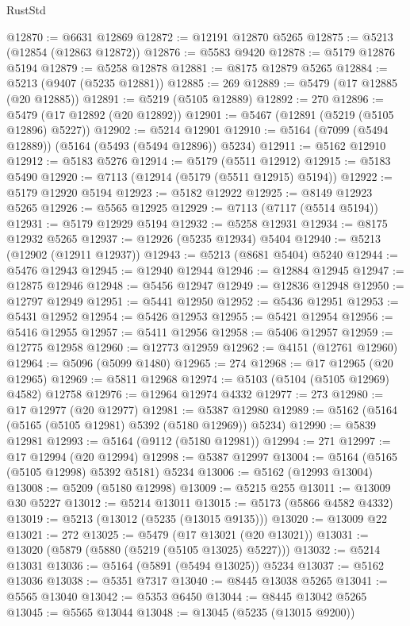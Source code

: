 \begin{lexlean}{RustStd}
\begin{coremodule}
@12870 := @6631 @12869
@12872 := @12191 @12870 @5265
@12875 := @5213 (@12854 (@12863 @12872))
@12876 := @5583 @9420
@12878 := @5179 @12876 @5194
@12879 := @5258 @12878
@12881 := @8175 @12879 @5265
@12884 := @5213 (@9407 (@5235 @12881))
@12885 := 269
@12889 := @5479 (@17 @12885 (@20 @12885))
@12891 := @5219 (@5105 @12889)
@12892 := 270
@12896 := @5479 (@17 @12892 (@20 @12892))
@12901 := @5467 (@12891 (@5219 (@5105 @12896) @5227))
@12902 := @5214 @12901
@12910 := @5164 (@7099 (@5494 @12889)) (@5164 (@5493 (@5494 @12896)) @5234)
@12911 := @5162 @12910
@12912 := @5183 @5276
@12914 := @5179 (@5511 @12912)
@12915 := @5183 @5490
@12920 := @7113 (@12914 (@5179 (@5511 @12915) @5194))
@12922 := @5179 @12920 @5194
@12923 := @5182 @12922
@12925 := @8149 @12923 @5265
@12926 := @5565 @12925
@12929 := @7113 (@7117 (@5514 @5194))
@12931 := @5179 @12929 @5194
@12932 := @5258 @12931
@12934 := @8175 @12932 @5265
@12937 := @12926 (@5235 @12934) @5404
@12940 := @5213 (@12902 (@12911 @12937))
@12943 := @5213 (@8681 @5404) @5240
@12944 := @5476 @12943
@12945 := @12940 @12944
@12946 := @12884 @12945
@12947 := @12875 @12946
@12948 := @5456 @12947
@12949 := @12836 @12948
@12950 := @12797 @12949
@12951 := @5441 @12950
@12952 := @5436 @12951
@12953 := @5431 @12952
@12954 := @5426 @12953
@12955 := @5421 @12954
@12956 := @5416 @12955
@12957 := @5411 @12956
@12958 := @5406 @12957
@12959 := @12775 @12958
@12960 := @12773 @12959
@12962 := @4151 (@12761 @12960)
@12964 := @5096 (@5099 @1480)
@12965 := 274
@12968 := @17 @12965 (@20 @12965)
@12969 := @5811 @12968
@12974 := @5103 (@5104 (@5105 @12969) @4582) @12758
@12976 := @12964 @12974 @4332
@12977 := 273
@12980 := @17 @12977 (@20 @12977)
@12981 := @5387 @12980
@12989 := @5162 (@5164 (@5165 (@5105 @12981) @5392 (@5180 @12969)) @5234)
@12990 := @5839 @12981
@12993 := @5164 (@9112 (@5180 @12981))
@12994 := 271
@12997 := @17 @12994 (@20 @12994)
@12998 := @5387 @12997
@13004 := @5164 (@5165 (@5105 @12998) @5392 @5181) @5234
@13006 := @5162 (@12993 @13004)
@13008 := @5209 (@5180 @12998)
@13009 := @5215 @255
@13011 := @13009 @30 @5227
@13012 := @5214 @13011
@13015 := @5173 (@5866 @4582 @4332)
@13019 := @5213 (@13012 (@5235 (@13015 @9135)))
@13020 := @13009 @22
@13021 := 272
@13025 := @5479 (@17 @13021 (@20 @13021))
@13031 := @13020 (@5879 (@5880 (@5219 (@5105 @13025) @5227)))
@13032 := @5214 @13031
@13036 := @5164 (@5891 (@5494 @13025)) @5234
@13037 := @5162 @13036
@13038 := @5351 @7317
@13040 := @8445 @13038 @5265
@13041 := @5565 @13040
@13042 := @5353 @6450
@13044 := @8445 @13042 @5265
@13045 := @5565 @13044
@13048 := @13045 (@5235 (@13015 @9200))

\end{coremodule}
\end{lexlean}
